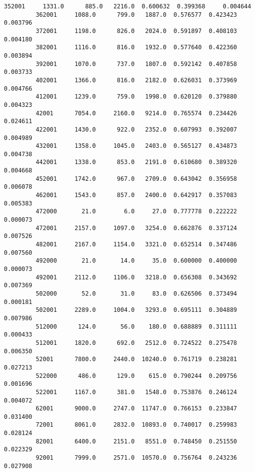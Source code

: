 \documentclass[11pt]{article}
\begin{document}
\begin{Verbatim}[commandchars=\\\{\}]
         352001     1331.0      885.0   2216.0  0.600632  0.399368     0.004644   
         362001     1088.0      799.0   1887.0  0.576577  0.423423     0.003796   
         372001     1198.0      826.0   2024.0  0.591897  0.408103     0.004180   
         382001     1116.0      816.0   1932.0  0.577640  0.422360     0.003894   
         392001     1070.0      737.0   1807.0  0.592142  0.407858     0.003733   
         402001     1366.0      816.0   2182.0  0.626031  0.373969     0.004766   
         412001     1239.0      759.0   1998.0  0.620120  0.379880     0.004323   
         42001      7054.0     2160.0   9214.0  0.765574  0.234426     0.024611   
         422001     1430.0      922.0   2352.0  0.607993  0.392007     0.004989   
         432001     1358.0     1045.0   2403.0  0.565127  0.434873     0.004738   
         442001     1338.0      853.0   2191.0  0.610680  0.389320     0.004668   
         452001     1742.0      967.0   2709.0  0.643042  0.356958     0.006078   
         462001     1543.0      857.0   2400.0  0.642917  0.357083     0.005383   
         472000       21.0        6.0     27.0  0.777778  0.222222     0.000073   
         472001     2157.0     1097.0   3254.0  0.662876  0.337124     0.007526   
         482001     2167.0     1154.0   3321.0  0.652514  0.347486     0.007560   
         492000       21.0       14.0     35.0  0.600000  0.400000     0.000073   
         492001     2112.0     1106.0   3218.0  0.656308  0.343692     0.007369   
         502000       52.0       31.0     83.0  0.626506  0.373494     0.000181   
         502001     2289.0     1004.0   3293.0  0.695111  0.304889     0.007986   
         512000      124.0       56.0    180.0  0.688889  0.311111     0.000433   
         512001     1820.0      692.0   2512.0  0.724522  0.275478     0.006350   
         52001      7800.0     2440.0  10240.0  0.761719  0.238281     0.027213   
         522000      486.0      129.0    615.0  0.790244  0.209756     0.001696   
         522001     1167.0      381.0   1548.0  0.753876  0.246124     0.004072   
         62001      9000.0     2747.0  11747.0  0.766153  0.233847     0.031400   
         72001      8061.0     2832.0  10893.0  0.740017  0.259983     0.028124   
         82001      6400.0     2151.0   8551.0  0.748450  0.251550     0.022329   
         92001      7999.0     2571.0  10570.0  0.756764  0.243236     0.027908   
         

\end{Verbatim}
\end{document}

